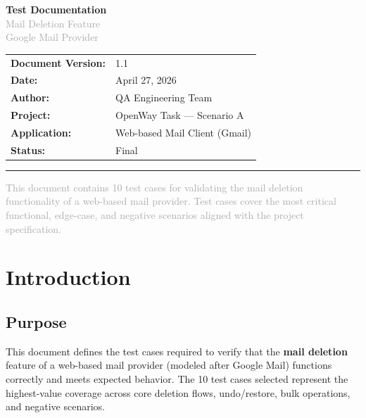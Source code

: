 \documentclass[12pt,a4paper]{article}
\begin{document}
\begin{titlepage}
    \centering
    \vspace*{3cm}

    {\Huge\bfseries\textcolor{headerblue}{Test Documentation}}\\[0.5cm]
    {\LARGE\textcolor{darkgray}{Mail Deletion Feature}}\\[0.3cm]
    {\large\textcolor{darkgray}{Google Mail Provider}}\\[2cm]

    \begin{tabular}{ll}
        \textbf{Document Version:} & 1.1 \\
        \textbf{Date:}             & April 27, 2026 \\
        \textbf{Author:}           & QA Engineering Team \\
        \textbf{Project:}          & OpenWay Task --- Scenario A \\
        \textbf{Application:}      & Web-based Mail Client (Gmail) \\
        \textbf{Status:}           & Final \\
    \end{tabular}

    \vfill

    \noindent\rule{\textwidth}{1pt}
    {\small\textcolor{darkgray}{This document contains 10 test cases for validating the mail deletion functionality of a web-based mail provider. Test cases cover the most critical functional, edge-case, and negative scenarios aligned with the project specification.}}
\end{titlepage}

\tableofcontents
\newpage

\section{Introduction}

\subsection{Purpose}
This document defines the test cases required to verify that the \textbf{mail deletion} feature of a web-based mail provider (modeled after Google Mail) functions correctly and meets expected behavior. The 10 test cases selected represent the highest-value coverage across core deletion flows, undo/restore, bulk operations, and negative scenarios.
\end{document}
